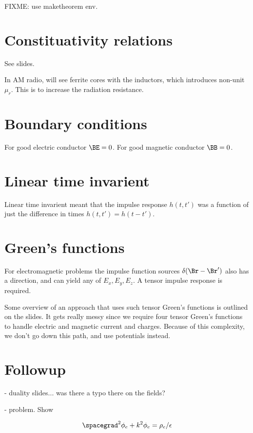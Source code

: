 FIXME:  use maketheorem env.

\section{Constituativity relations}

See slides.

In AM radio, will see ferrite cores with the inductors, which introduces non-unit \( \mu_r \).  This is to increase the radiation resistance.

\section{Boundary conditions}

For good electric conductor \( \BE = 0 \).
For good magnetic conductor \( \BB = 0 \).

\section{Linear time invarient}

Linear time invarient meant that the impulse response \( h(t,t') \) was a function of just the difference in times \( h(t,t') = h(t-t') \).

\section{Green's functions}

For electromagnetic problems the impulse function sources \( \delta(\Br - \Br') \) also has a direction, and can yield any of \( E_x, E_y, E_z \).  A tensor impulse response is required.

Some overview of an approach that uses such tensor Green's functions is outlined on the slides.  It gets really messy since we require four tensor Green's functions to handle electric and magnetic current and charges.  Because of this complexity, we don't go down this path, and use potentials instead.

\section{Followup}

- duality slides... was there a typo there on the fields?

- problem.  Show

\begin{dmath}\label{eqn:chapter3Notes:n}
\spacegrad^2 \phi_e + k^2 \phi_e = \rho_e/\epsilon
\end{dmath}

